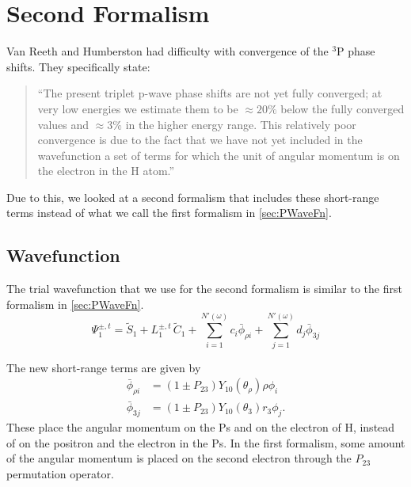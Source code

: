 \documentclass[Dissertation.tex]{subfiles}
\begin{document}
\section{Second Formalism}
\label{sec:PWave2Formalism}

Van Reeth and Humberston \cite{VanReeth2004} had difficulty with convergence 
of the $^3$P phase shifts. They specifically state:
\begin{quote}
``The present triplet p-wave phase shifts are not yet fully converged; at very 
low energies we estimate them to be $\approx 20\%$ below the fully converged 
values and $\approx 3\%$ in the higher energy range. This relatively poor 
convergence is due to the fact that we have not yet included in the 
wavefunction a set of terms for which the unit of angular momentum is on the 
electron in the H atom.''
\end{quote}
Due to this, we looked at a second formalism that includes these short-range 
terms instead of what we call the first formalism in \cref{sec:PWaveFn}. 

\subsection{Wavefunction}
The trial wavefunction that we use for the second formalism is similar to the
first formalism in \cref{sec:PWaveFn}.
\begin{equation}
\Psi_1^{\pm,t} = \widetilde{S}_1 + L_1^{\pm,t} \, \widetilde{C}_1 + \sum_{i=1}^{N'(\omega)} c_i \bar{\phi}_{\rho i} + \sum_{j=1}^{N'(\omega)} d_j \bar{\phi}_{3j}
\label{eq:PWave2ndWavefn}
\end{equation}

\noindent The new short-range terms are given by
\begin{subequations}
\label{eq:PWave2ndPhiBar}
\begin{align}
\bar{\phi}_{\rho i} &= \left(1 \pm P_{23}\right) Y_{10}(\theta_\rho) \rho \phi_i \label{eq:PWave2ndPhi1i}\\
\bar{\phi}_{3j} &= \left(1 \pm P_{23}\right) Y_{10}(\theta_3) r_3 \phi_j \label{eq:PWave2ndPhi2j}.
\end{align}
\end{subequations}
These place the angular momentum on the Ps and on the electron of H, instead of
on the positron and the electron in the Ps. In the first formalism, some amount
of the angular momentum is placed on the second electron through the $P_{23}$
permutation operator.
\end{document}
